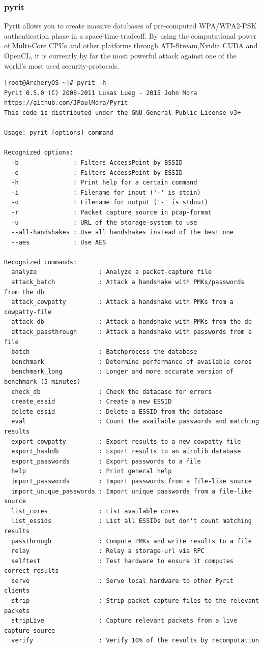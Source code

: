 \documentclass{article}
\begin{document}
\subsubsection{pyrit}
Pyrit allows you to create massive databases of pre-computed WPA/WPA2-PSK authentication phase in a space-time-tradeoff. By using the computational power of Multi-Core CPUs and other platforms through ATI-Stream,Nvidia CUDA and OpenCL, it is currently by far the most powerful attack against one of the world's most used security-protocols.
\begin{lstlisting}
[root@ArcheryOS ~]# pyrit -h
Pyrit 0.5.0 (C) 2008-2011 Lukas Lueg - 2015 John Mora
https://github.com/JPaulMora/Pyrit
This code is distributed under the GNU General Public License v3+

Usage: pyrit [options] command

Recognized options:
  -b               : Filters AccessPoint by BSSID
  -e               : Filters AccessPoint by ESSID
  -h               : Print help for a certain command
  -i               : Filename for input ('-' is stdin)
  -o               : Filename for output ('-' is stdout)
  -r               : Packet capture source in pcap-format
  -u               : URL of the storage-system to use
  --all-handshakes : Use all handshakes instead of the best one
  --aes            : Use AES

Recognized commands:
  analyze                 : Analyze a packet-capture file
  attack_batch            : Attack a handshake with PMKs/passwords from the db
  attack_cowpatty         : Attack a handshake with PMKs from a cowpatty-file
  attack_db               : Attack a handshake with PMKs from the db
  attack_passthrough      : Attack a handshake with passwords from a file
  batch                   : Batchprocess the database
  benchmark               : Determine performance of available cores
  benchmark_long          : Longer and more accurate version of benchmark (5 minutes)
  check_db                : Check the database for errors
  create_essid            : Create a new ESSID
  delete_essid            : Delete a ESSID from the database
  eval                    : Count the available passwords and matching results
  export_cowpatty         : Export results to a new cowpatty file
  export_hashdb           : Export results to an airolib database
  export_passwords        : Export passwords to a file
  help                    : Print general help
  import_passwords        : Import passwords from a file-like source
  import_unique_passwords : Import unique passwords from a file-like source
  list_cores              : List available cores
  list_essids             : List all ESSIDs but don't count matching results
  passthrough             : Compute PMKs and write results to a file
  relay                   : Relay a storage-url via RPC
  selftest                : Test hardware to ensure it computes correct results
  serve                   : Serve local hardware to other Pyrit clients
  strip                   : Strip packet-capture files to the relevant packets
  stripLive               : Capture relevant packets from a live capture-source
  verify                  : Verify 10% of the results by recomputation
\end{lstlisting}
\end{document}
